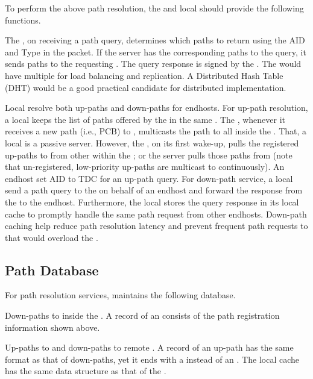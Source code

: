 To perform the above path resolution, the \ISDC \PS and local \PS should provide the following functions.

\noindent {\bf \ISDC \PS: } The \ISDC \PS, on receiving a path query, determines which paths to return using the AID and Type in the packet. If the server has the corresponding paths to the query, it sends paths to the requesting \AD. The query response is signed by the \ISDC \PS.  The \ISDC would have multiple \PSs for load balancing and replication. A Distributed Hash Table (DHT) would be a good practical candidate for distributed \PS implementation. 


 Local \PSs resolve both up-paths and down-paths for endhosts. For up-path resolution, a local \PS keeps the list of paths offered by the \BS in the same \AD. The \BS, whenever it receives a new path (i.e., PCB) to \ISDC,  multicasts the path to all \PSs inside the \AD. That, a local \PS is a passive server. However, the \PS, on its first wake-up, pulls the registered up-paths to \ISDC from other \PSs within the \AD; or the server pulls those paths from \ISDC (note that un-registered, low-priority up-paths are multicast to \PSs continuously). An endhost set AID to TDC for an up-path query. For down-path service, a local \PS send a path query to the \ISDC on behalf of an endhost and forward the response from the \ISDC to the endhost. Furthermore, the local \PS stores the query response in its local cache to promptly handle the same path request from other endhosts. Down-path caching help reduce path resolution latency and prevent frequent path requests to \ISDC that would overload the \ISDC \PSs.



\subsection{Path Database}
For path resolution services, \PSs maintains the following database.

\noindent {\bf \ISDC \PS: } Down-paths to \STUB \ADs inside the \ISD. \newline
A record of an \STUB \AD consists of the path registration information shown above.

 Up-paths to \ISDC and down-paths to remote \STUB \ADs.
A record of an up-path has the same format as that of down-paths, yet it ends with a \ISDC \AD instead of an \STUB \AD. The local \PS cache has the same data structure as that of the \ISDC \PS.


